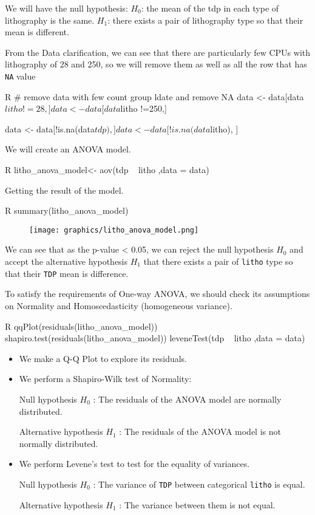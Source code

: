 We will have the null hypothesis:
$H_0$: the mean of the tdp in each type of lithography is the same.
$H_1$: there exists a pair of lithography type so that their mean is different.

From the Data clarification, we can see that there are particularly few CPUs with lithography of 28 and 250, so we will remove them as well as all the row that has \texttt{NA} value
\begin{code}{R}
    # remove data with few count group ldate and remove NA
    data <- data[data$litho !=28,] 
    data <- data[data$litho !=250,] 

    data <- data[!is.na(data$tdp), ]
    data <- data[!is.na(data$litho), ]
\end{code}

We will create an ANOVA model.

\begin{code}{R}
    litho_anova_model<- aov(tdp ~ litho ,data = data)
\end{code}

Getting the result of the model.

\begin{code}{R}
    summary(litho_anova_model)
\end{code}

\begin{figure}[htbp]
    \centering
    \texttt{[image: graphics/litho\_anova\_model.png]}
\end{figure}

We can see that as the p-value < 0.05, we can reject the null hypothesis $H_0$ and accept the 
alternative hypothesis $H_1$ that there exists a pair of \verb|litho| type so that their \verb|TDP| mean is difference.

To satisfy the requirements of One-way ANOVA, we should check its assumptions on Normality and Homoscedasticity (homogeneous variance).

\begin{code}{R}
    qqPlot(residuals(litho_anova_model))
    shapiro.test(residuals(litho_anova_model))
    leveneTest(tdp ~ litho ,data = data)
\end{code}
\begin{itemize}
    \item We make a Q-Q Plot to explore its residuals.

    \item We perform a Shapiro-Wilk test of Normality:
    
        \qquad Null hypothesis $H_0$ : The residuals of the ANOVA model are normally distributed.

        \qquad Alternative hypothesis $H_1$ : The residuals of the ANOVA model is not normally distributed.

    \item We perform Levene's test to test for the equality of variances.
    
        \qquad Null hypothesis $H_0$ : The variance of \verb|TDP| between categorical \verb|litho| is equal.

        \qquad Alternative hypothesis $H_1$ : The variance between them is not equal.
\end{itemize}

